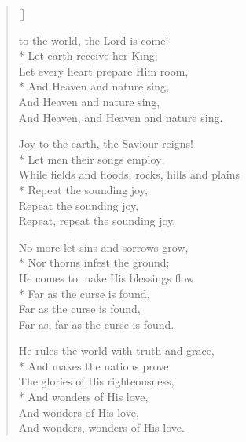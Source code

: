 \newHymn
{}

\begin{verse}[\versewidth]

 to the world, the Lord is come!\\*
Let earth receive her King;\\
Let every heart prepare Him room,\\*
And Heaven and nature sing,\\
And Heaven and nature sing,\\
And Heaven, and Heaven and nature sing.

Joy to the earth, the Saviour reigns!\\*
Let men their songs employ;\\
While fields and floods, rocks, hills and plains\\*
Repeat the sounding joy,\\
Repeat the sounding joy,\\
Repeat, repeat the sounding joy.

No more let sins and sorrows grow,\\*
Nor thorns infest the ground;\\
He comes to make His blessings flow\\*
Far as the curse is found,\\
Far as the curse is found,\\
Far as, far as the curse is found.

He rules the world with truth and grace,\\*
And makes the nations prove\\
The glories of His righteousness,\\*
And wonders of His love,\\
And wonders of His love,\\
And wonders, wonders of His love.

\end{verse}



